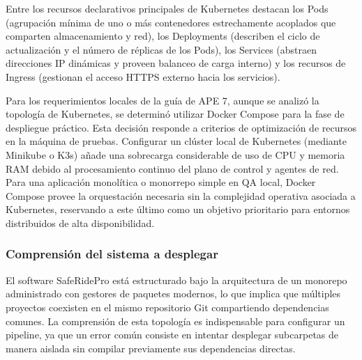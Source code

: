 \documentclass{article}
\begin{document}
Entre los recursos declarativos principales de Kubernetes destacan los Pods (agrupación mínima de uno o más contenedores estrechamente acoplados que comparten almacenamiento y red), los Deployments (describen el ciclo de actualización y el número de réplicas de los Pods), los Services (abstraen direcciones IP dinámicas y proveen balanceo de carga interno) y los recursos de Ingress (gestionan el acceso HTTPS externo hacia los servicios).

Para los requerimientos locales de la guía de APE 7, aunque se analizó la topología de Kubernetes, se determinó utilizar Docker Compose para la fase de despliegue práctico. Esta decisión responde a criterios de optimización de recursos en la máquina de pruebas. Configurar un clúster local de Kubernetes (mediante Minikube o K3s) añade una sobrecarga considerable de uso de CPU y memoria RAM debido al procesamiento continuo del plano de control y agentes de red. Para una aplicación monolítica o monorrepo simple en QA local, Docker Compose provee la orquestación necesaria sin la complejidad operativa asociada a Kubernetes, reservando a este último como un objetivo prioritario para entornos distribuidos de alta disponibilidad.

\subsubsection{Comprensión del sistema a desplegar}
El software SafeRidePro está estructurado bajo la arquitectura de un monorepo administrado con gestores de paquetes modernos, lo que implica que múltiples proyectos coexisten en el mismo repositorio Git compartiendo dependencias comunes. La comprensión de esta topología es indispensable para configurar un pipeline, ya que un error común consiste en intentar desplegar subcarpetas de manera aislada sin compilar previamente sus dependencias directas.
\end{document}
